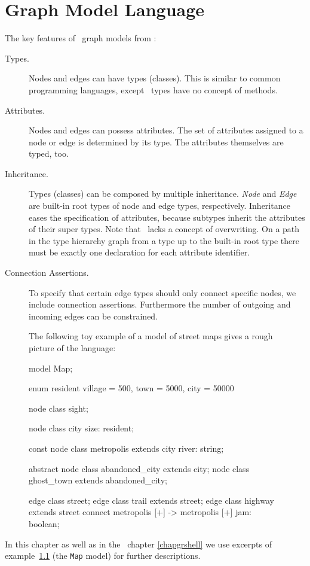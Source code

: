 ﻿\chapter{Graph Model Language}
\label{chapmodellang}
The key features of \GrG\ graph models from \cite{geiss}:

\begin{description}
\item[Types.] Nodes and edges can have types (classes). This is similar to common programming languages, except \GrG\ types have no concept of methods. 
\item[Attributes.] Nodes and edges can possess attributes. The set of attributes assigned to a node or edge is determined by its type. The attributes themselves are typed, too.
\item[Inheritance.] Types (classes) can be composed by multiple inheritance. \emph{Node} and \emph{Edge} are built-in root types of node and edge types, respectively. Inheritance eases the specification of attributes, because subtypes inherit the attributes of their super types. Note that \GrG\ lacks a concept of overwriting. On a path in the type hierarchy graph from a type up to the built-in root type there must be exactly one declaration for each attribute identifier.
\item[Connection Assertions.] To specify that certain edge types should only connect specific nodes, we include connection assertions. Furthermore the number of outgoing and incoming edges can be constrained.
\end{description}

\begin{figure}[htbf]
\begin{example}\label{ex:model:map}
The following toy example of a model of street maps gives a rough picture of the language:
\begin{grgen}
model Map;

enum resident {village = 500, town = 5000, city = 50000}

node class sight;

node class city {
	size: resident;
}

const node class metropolis extends city {
  river: string;
}  

abstract node class abandoned_city extends city;
node class ghost_town extends abandoned_city;

edge class street;
edge class trail extends street;
edge class highway extends street
    connect metropolis [+] -> metropolis [+]
{
    jam: boolean;
}
\end{grgen}
\end{example}
\end{figure}
In this chapter as well as in the \GrShell\ chapter \ref{chapgrshell} we use excerpts of example~\ref{ex:model:map} (the \texttt{Map} model) for further descriptions.

